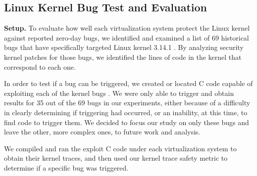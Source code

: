 {{{%

\subsection{Linux Kernel Bug Test and Evaluation}
\label{Linux-Kernel-Bug-Test-and-Evaluation}

\textbf{Setup.}
To evaluate how well each virtualization system protect the Linux kernel against 
reported zero-day bugs, we identified and examined a list of  69 historical bugs that have
specifically targeted Linux kernel 3.14.1 \cite{CVE-Datasource}. 
By analyzing security kernel patches for those bugs,
we identified the lines of code in the kernel that correspond to each one. 

In order to test if a bug can be triggered, we created or located C
code capable of exploiting each of the kernel bugs \cite{Exploit-Database}.
We were only able to trigger and obtain results for 35 out of the 69 bugs in our experiments, 
either because of a difficulty in clearly determining if triggering had occurred, or an inability,
at this time, to find code to trigger them. We decided to focus our study on
only these bugs and leave the other, more complex ones, to future work and analysis.

We compiled and ran the exploit C code under each virtualization system to
obtain their kernel traces, and then used our kernel trace safety metric to
determine if a specific bug was triggered.


}}}
